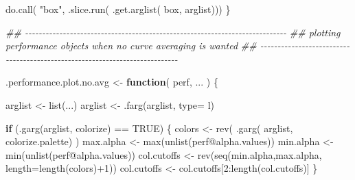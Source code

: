 \documentclass[
  letterpaper,
  DIV=11,
  numbers=noendperiod]{scrartcl}
\newenvironment{Shaded}{\begin{snugshade}}{\end{snugshade}}
\newcommand{\AttributeTok}[1]{\textcolor[rgb]{0.40,0.45,0.13}{#1}}
\newcommand{\ConstantTok}[1]{\textcolor[rgb]{0.56,0.35,0.01}{#1}}
\newcommand{\ControlFlowTok}[1]{\textcolor[rgb]{0.00,0.23,0.31}{\textbf{#1}}}
\newcommand{\DecValTok}[1]{\textcolor[rgb]{0.68,0.00,0.00}{#1}}
\newcommand{\DocumentationTok}[1]{\textcolor[rgb]{0.37,0.37,0.37}{\textit{#1}}}
\newcommand{\FunctionTok}[1]{\textcolor[rgb]{0.28,0.35,0.67}{#1}}
\newcommand{\NormalTok}[1]{\textcolor[rgb]{0.00,0.23,0.31}{#1}}
\newcommand{\OtherTok}[1]{\textcolor[rgb]{0.00,0.23,0.31}{#1}}
\newcommand{\SpecialCharTok}[1]{\textcolor[rgb]{0.37,0.37,0.37}{#1}}
\newcommand{\StringTok}[1]{\textcolor[rgb]{0.13,0.47,0.30}{#1}}
\begin{document}
\begin{Shaded}
\begin{Highlighting}[]
    \FunctionTok{do.call}\NormalTok{( }\StringTok{"box"}\NormalTok{, }\FunctionTok{.slice.run}\NormalTok{( }\FunctionTok{.get.arglist}\NormalTok{( }\StringTok{\textquotesingle{}box\textquotesingle{}}\NormalTok{, arglist)))}
\NormalTok{\}}

\DocumentationTok{\#\# {-}{-}{-}{-}{-}{-}{-}{-}{-}{-}{-}{-}{-}{-}{-}{-}{-}{-}{-}{-}{-}{-}{-}{-}{-}{-}{-}{-}{-}{-}{-}{-}{-}{-}{-}{-}{-}{-}{-}{-}{-}{-}{-}{-}{-}{-}{-}{-}{-}{-}{-}{-}{-}{-}{-}{-}{-}{-}{-}{-}{-}{-}{-}{-}{-}{-}{-}{-}{-}{-}{-}{-}{-}{-}{-}{-}}
\DocumentationTok{\#\# plotting performance objects when no curve averaging is wanted}
\DocumentationTok{\#\# {-}{-}{-}{-}{-}{-}{-}{-}{-}{-}{-}{-}{-}{-}{-}{-}{-}{-}{-}{-}{-}{-}{-}{-}{-}{-}{-}{-}{-}{-}{-}{-}{-}{-}{-}{-}{-}{-}{-}{-}{-}{-}{-}{-}{-}{-}{-}{-}{-}{-}{-}{-}{-}{-}{-}{-}{-}{-}{-}{-}{-}{-}{-}{-}{-}{-}{-}{-}{-}{-}{-}{-}{-}{-}{-}{-}}

\NormalTok{.performance.plot.no.avg }\OtherTok{\textless{}{-}} \ControlFlowTok{function}\NormalTok{( perf, ... ) \{}

\NormalTok{    arglist }\OtherTok{\textless{}{-}} \FunctionTok{list}\NormalTok{(...)}
\NormalTok{    arglist }\OtherTok{\textless{}{-}} \FunctionTok{.farg}\NormalTok{(arglist, }\AttributeTok{type=} \StringTok{\textquotesingle{}l\textquotesingle{}}\NormalTok{)}
    
    \ControlFlowTok{if}\NormalTok{ (}\FunctionTok{.garg}\NormalTok{(arglist, }\StringTok{\textquotesingle{}colorize\textquotesingle{}}\NormalTok{) }\SpecialCharTok{==} \ConstantTok{TRUE}\NormalTok{) \{}
\NormalTok{        colors }\OtherTok{\textless{}{-}} \FunctionTok{rev}\NormalTok{( }\FunctionTok{.garg}\NormalTok{( arglist, }\StringTok{\textquotesingle{}colorize.palette\textquotesingle{}}\NormalTok{) )}
\NormalTok{        max.alpha }\OtherTok{\textless{}{-}} \FunctionTok{max}\NormalTok{(}\FunctionTok{unlist}\NormalTok{(perf}\SpecialCharTok{@}\NormalTok{alpha.values))}
\NormalTok{        min.alpha }\OtherTok{\textless{}{-}} \FunctionTok{min}\NormalTok{(}\FunctionTok{unlist}\NormalTok{(perf}\SpecialCharTok{@}\NormalTok{alpha.values))}
\NormalTok{        col.cutoffs }\OtherTok{\textless{}{-}} \FunctionTok{rev}\NormalTok{(}\FunctionTok{seq}\NormalTok{(min.alpha,max.alpha, }\AttributeTok{length=}\FunctionTok{length}\NormalTok{(colors)}\SpecialCharTok{+}\DecValTok{1}\NormalTok{))}
\NormalTok{        col.cutoffs }\OtherTok{\textless{}{-}}\NormalTok{ col.cutoffs[}\DecValTok{2}\SpecialCharTok{:}\FunctionTok{length}\NormalTok{(col.cutoffs)]}
\NormalTok{    \}}
    

\end{Highlighting}
\end{Shaded}
\end{document}
